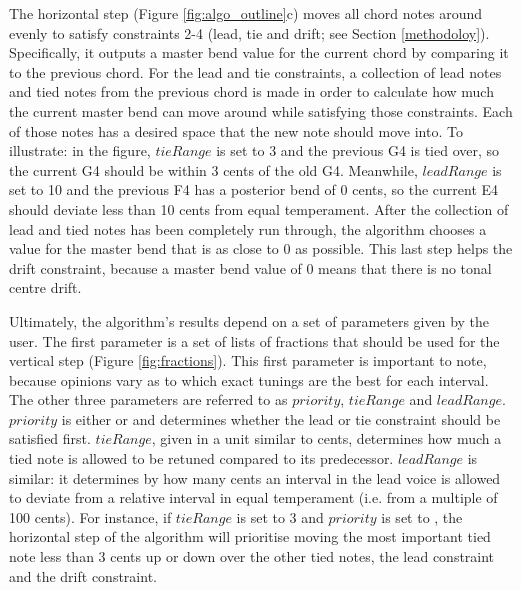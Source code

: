 \documentclass[a4paper]{article}
\begin{document}
The horizontal step (Figure \ref{fig:algo_outline}c) moves all chord notes around evenly to satisfy constraints 2-4 (lead, tie and drift; see Section \ref{methodoloy}). Specifically, it outputs a master bend value for the current chord by comparing it to the previous chord. For the lead and tie constraints, a collection of lead notes and tied notes from the previous chord is made in order to calculate how much the current master bend can move around while satisfying those constraints. Each of those notes has a desired space that the new note should move into. To illustrate: in the figure, $\mathit{tieRange}$ is set to 3 and the previous G4 is tied over, so the current G4 should be within 3 cents of the old G4. Meanwhile, $\mathit{leadRange}$ is set to 10 and the previous F4 has a posterior bend of 0 cents, so the current E4 should deviate less than 10 cents from equal temperament. After the collection of lead and tied notes has been completely run through, the algorithm chooses a value for the master bend that is as close to 0 as possible. This last step helps the drift constraint, because a master bend value of 0 means that there is no tonal centre drift.

Ultimately, the algorithm's results depend on a set of parameters given by the user. The first parameter is a set of lists of fractions that should be used for the vertical step (Figure \ref{fig:fractions}). This first parameter is important to note, because opinions vary as to which exact tunings are the best for each interval. The other three parameters are referred to as $\mathit{priority}$, $\mathit{tieRange}$ and $\mathit{leadRange}$. $\mathit{priority}$ is either  or  and determines whether the lead or tie constraint should be satisfied first. $\mathit{tieRange}$, given in a unit similar to cents, determines how much a tied note is allowed to be retuned compared to its predecessor. $\mathit{leadRange}$ is similar: it determines by how many cents an interval in the lead voice is allowed to deviate from a relative interval in equal temperament (i.e. from a multiple of 100 cents). For instance, if $\mathit{tieRange}$ is set to 3 and $\mathit{priority}$ is set to , the horizontal step of the algorithm will prioritise moving the most important tied note less than 3 cents up or down over the other tied notes, the lead constraint and the drift constraint.
\end{document}
